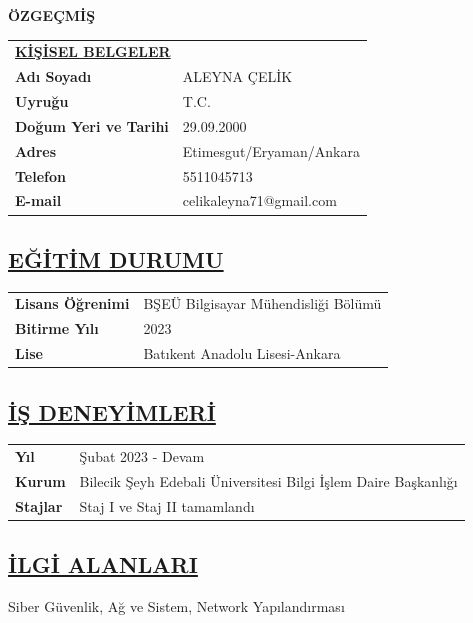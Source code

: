 \centerline{\textbf{ÖZGEÇMİŞ}}
\begin{table}[H]
    \renewcommand{\arraystretch}{1.5}
    \begin{tabular}{l@{\bfseries: }l}
    \multicolumn{2}{l}{\underline{\textbf{KİŞİSEL BELGELER}}} \\
    \textbf{Adı Soyadı} & ALEYNA ÇELİK \\
    \textbf{Uyruğu} & T.C. \\
    \textbf{Doğum Yeri ve Tarihi} & 29.09.2000 \\
    \textbf{Adres} & Etimesgut/Eryaman/Ankara \\
    \textbf{Telefon} & 5511045713 \\
    \textbf{E-mail} & celikaleyna71@gmail.com \\
    \end{tabular}
    \end{table}
    
    \subsection*{\underline{\textbf{EĞİTİM DURUMU}}}
    \begin{tabular}{l@{\bfseries: }l}
    \textbf{Lisans Öğrenimi} & BŞEÜ Bilgisayar Mühendisliği Bölümü \\
    \textbf{Bitirme Yılı} & 2023 \\
    \textbf{Lise} & Batıkent Anadolu Lisesi-Ankara \\
    \end{tabular}
    
    \subsection*{\underline{\textbf{İŞ DENEYİMLERİ}}}
    \begin{tabular}{l@{\bfseries: }l}
    \textbf{Yıl} & Şubat 2023 - Devam \\
    \textbf{Kurum} & Bilecik Şeyh Edebali Üniversitesi Bilgi İşlem Daire Başkanlığı \\
    \textbf{Stajlar} & Staj I ve Staj II tamamlandı \\
    \end{tabular}
    
    \subsection*{\underline{\textbf{İLGİ ALANLARI}}}
    Siber Güvenlik, Ağ ve Sistem, Network Yapılandırması
    
